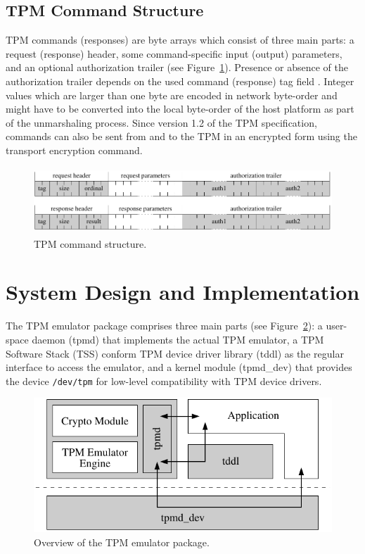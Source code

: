 \documentclass[11pt,letterpaper]{article}
\newcommand{\file}[1]{\small\texttt{#1}\normalsize}
\begin{document}
\subsection{TPM Command Structure}
TPM commands (responses) are byte arrays which consist of three main parts: a request (response)
header, some command-specific input (output) parameters, and an optional authorization trailer
(see Figure~\ref{fig:tpm_command}). Presence or absence of the authorization trailer depends on the
used command (response) tag field . Integer values which are larger than one byte are encoded
in network byte-order and might have to be converted into the local byte-order of the host platform
as part of the unmarshaling process. Since version 1.2 of the TPM specification, commands can
also be sent from and to the TPM in an encrypted form using the transport encryption command.

\begin{figure}[h]
\centering
\includegraphics[height=25mm]{figures/tpm_command_structure}
\caption{TPM command structure.}
\label{fig:tpm_command}
\end{figure}

\section{System Design and Implementation}
The TPM emulator package comprises three main parts (see Figure~\ref{fig:system_overview}):
a user-space daemon (tpmd) that implements the actual TPM emulator, a TPM Software Stack (TSS)
conform TPM device driver library (tddl) as the regular interface to access the emulator, and a
kernel module (tpmd\_dev) that provides the device \file{/dev/tpm} for low-level compatibility
with TPM device drivers.

\begin{figure}[ht]
\centering
\includegraphics[width=.5\textwidth]{figures/system_overview}
\caption{Overview of the TPM emulator package.}
\label{fig:system_overview}
\end{figure}
\end{document}
